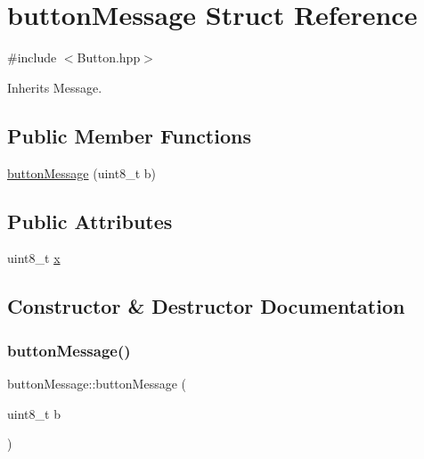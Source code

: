\hypertarget{structbutton_message}{}\section{button\+Message Struct Reference}
\label{structbutton_message}


{\ttfamily \#include $<$Button.\+hpp$>$}



Inherits Message.

\subsection*{Public Member Functions}
\begin{DoxyCompactItemize}
\item 
\hyperlink{structbutton_message_a99b3c60d89890c466058432b13b89723}{button\+Message} (uint8\+\_\+t b)
\end{DoxyCompactItemize}
\subsection*{Public Attributes}
\begin{DoxyCompactItemize}
\item 
uint8\+\_\+t \hyperlink{structbutton_message_a60b6978886b39350eadfe902d83eb7ad}{x}
\end{DoxyCompactItemize}


\subsection{Constructor \& Destructor Documentation}
\mbox{\label{structbutton_message_a99b3c60d89890c466058432b13b89723}} 
\subsubsection{\texorpdfstring{button\+Message()}{buttonMessage()}}
{\footnotesize\ttfamily button\+Message\+::button\+Message (\begin{DoxyParamCaption}\item[{uint8\+\_\+t}]{b }\end{DoxyParamCaption})\hspace{0.3cm}{\ttfamily [inline]}}



